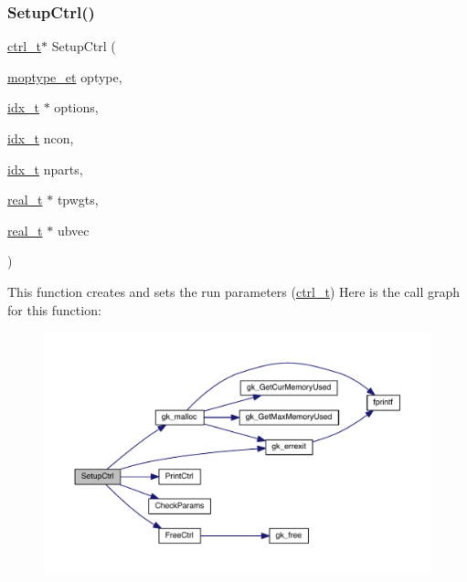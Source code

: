 \subsubsection{\texorpdfstring{Setup\+Ctrl()}{SetupCtrl()}}
{\footnotesize\ttfamily \hyperlink{a00742}{ctrl\+\_\+t}$\ast$ Setup\+Ctrl (\begin{DoxyParamCaption}\item[{\hyperlink{a00876_a64ee21e6d3a57701a812d0903a2f0401}{moptype\+\_\+et}}]{optype,  }\item[{\hyperlink{a00876_aaa5262be3e700770163401acb0150f52}{idx\+\_\+t} $\ast$}]{options,  }\item[{\hyperlink{a00876_aaa5262be3e700770163401acb0150f52}{idx\+\_\+t}}]{ncon,  }\item[{\hyperlink{a00876_aaa5262be3e700770163401acb0150f52}{idx\+\_\+t}}]{nparts,  }\item[{\hyperlink{a00876_a1924a4f6907cc3833213aba1f07fcbe9}{real\+\_\+t} $\ast$}]{tpwgts,  }\item[{\hyperlink{a00876_a1924a4f6907cc3833213aba1f07fcbe9}{real\+\_\+t} $\ast$}]{ubvec }\end{DoxyParamCaption})}

This function creates and sets the run parameters (\hyperlink{a00742}{ctrl\+\_\+t}) Here is the call graph for this function\+:\nopagebreak
\begin{figure}[H]
\begin{center}
\leavevmode
\includegraphics[width=350pt]{a00254_a1420c4ffbe28e4c3349678037adcb918_cgraph}
\end{center}
\end{figure}
\mbox{\label{a00254_a3444d1d3ffb5ca450a1affaeb6d71b61}} 
